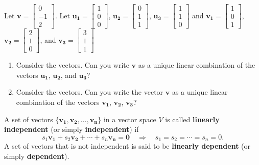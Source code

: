 \documentclass[20pt,a4paper]{extarticle}
\newcounter{example}
\newcounter{definition}
\begin{document}
\begin{example}%
Let $\mathbf{v} = \begin{bmatrix} 0 \\ -1 \\ 2 \end{bmatrix}$. Let $\mathbf{u_1} = \begin{bmatrix} 1 \\ 0 \\ 0 \end{bmatrix}$, $\mathbf{u_2} = \begin{bmatrix} 0 \\ 1 \\ 1 \end{bmatrix}$, $\mathbf{u_3} = \begin{bmatrix} 1 \\ 1 \\ 0 \end{bmatrix}$ and $\mathbf{v_1} = \begin{bmatrix} 1 \\ 0 \\ 1 \end{bmatrix}$, $\mathbf{v_2} = \begin{bmatrix} 2 \\ 1 \\ 0 \end{bmatrix}$, and $\mathbf{v_3} = \begin{bmatrix} 3 \\ 1 \\ 1 \end{bmatrix}$
\begin{enumerate}[label=\alph*)]
\item Consider the vectors. Can you write $\mathbf{v}$ as a unique linear combination of the vectors $\mathbf{u_1}$, $\mathbf{u_2}$, and $\mathbf{u_3}$? 
\item Consider the vectors. Can you write the vector $\mathbf{v}$ as a unique linear combination of the vectors $\mathbf{v_1}$, $\mathbf{v_2}$, $\mathbf{v_3}$?
\end{enumerate}
\end{example}

\begin{solution}

\end{solution}

\newpage 

\begin{definition}
A set of vectors $\{ \mathbf{v_1} , \mathbf{v_2} , \ldots , \mathbf{v_n} \}$ in a vector space $V$ is called \textbf{linearly independent} (or simply \textbf{independent}) if 
	\[
		s_1 \mathbf{v_1} + s_2 \mathbf{v_2} + \cdots + s_n \mathbf{v_n} = \mathbf{0} \quad \Rightarrow \quad s_1 = s_2 = \cdots = s_n = 0 .
	\]
A set of vectors that is not independent is said to be \textbf{linearly dependent} (or simply \textbf{dependent}).
\end{definition}
\end{document}
